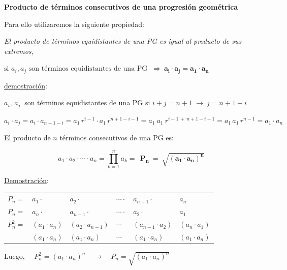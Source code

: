 \vspace{0.5cm}

\begin{large} \textbf{Producto de términos consecutivos de una progresión geométrica} \end{large}
\vspace{3mm}

Para ello utilizaremos la siguiente propiedad:

\emph{El producto de términos equidistantes de una PG es igual al producto de sus extremos}, 

$\text{si } a_i,a_j \text{ son términos equidistantes de una PG } \ \Rightarrow \  \boldsymbol{a_i\cdot a_j = a_1\cdot a_n}$


\underline{demostración}: 

$a_i, \, a_j\ $ son términos equidistantes de una PG si $i+j=n+1 \ \to \ j=n+1-i$

$a_i\cdot a_j=a_i\cdot a_{n+1-i}=a_1\, r^{i-1} \cdot a_1\, r^{n+1-i-1}=a_1\ a_1\ r^{i-1\, + \ n+1-i-1}=a_1\, a_1 \, r^{n-1}=a_1\cdot a_n$ \QED

\vspace{0.5cm}

\begin{theorem}

El producto de $n$ términos consecutivos de una PG es:

$$a_1 \cdot a_2 \cdot \cdots \cdot a_n= \displaystyle \prod_{k=1}^n a_k  = \ 
\boxed{ \ \boldsymbol{   
P_n \ = \ \sqrt{ (a_1\cdot a_n)^n } 
} \ }$$	

\end{theorem}

\underline{Demostración}:

\begin{table}[H]
\centering
\begin{tabular}{l|lllll}
$P_n=$ & $a_1\cdot$ & $a_2\cdot$ & $\cdots \cdot$ & $a_{n-1}\cdot$  & $a_n$ \\
$P_n=$ & $a_n\cdot$ & $a_{n-1}\cdot$ & $\cdots \cdot$ & $a_2\cdot$ & $a_1$  \\ \hline
$P_n^2=$ & $(a_1\cdot a_n)$ & $(a_2\cdot a_{n-1})$ & $\cdots$ & $(a_{n-1}\cdot a_2)$  & $(a_n \cdot a_1)$ \\
  & $(a_1\cdot a_n)$  & $(a_1\cdot a_n)$  & $\cdots $  & $(a_1\cdot a_n)$  & $(a_1\cdot a_n)$ 
\end{tabular}
\end{table}

Luego, $\quad P_n^2=(a_1\cdot a_n)^n \quad \to \quad  P_n=\sqrt{(a_1\cdot a_n)^n}$ \QED

